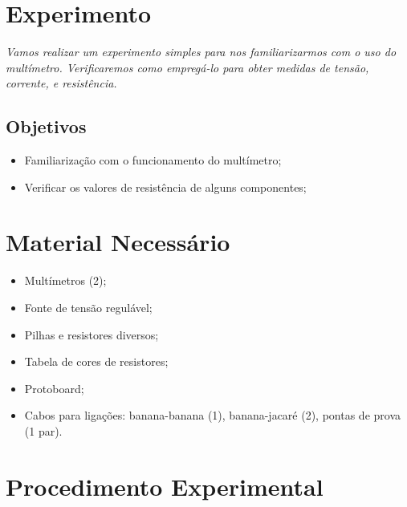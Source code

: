 \section{Experimento}

\emph{Vamos realizar um experimento simples para nos familiarizarmos com o uso do multímetro. Verificaremos como empregá-lo para obter medidas de tensão, corrente, e resistência.}

\subsection{Objetivos}

\begin{itemize}
	\item Familiarização com o funcionamento do multímetro;
	\item Verificar os valores de resistência de alguns componentes;
\end{itemize}

\section{Material Necessário}

\begin{itemize}
	\item Multímetros (2);
	\item Fonte de tensão regulável;
	\item Pilhas e resistores diversos;
	\item Tabela de cores de resistores;
	\item Protoboard;
	\item Cabos para ligações: banana-banana (1), banana-jacaré (2), pontas de prova (1 par).
\end{itemize}

\section{Procedimento Experimental}

